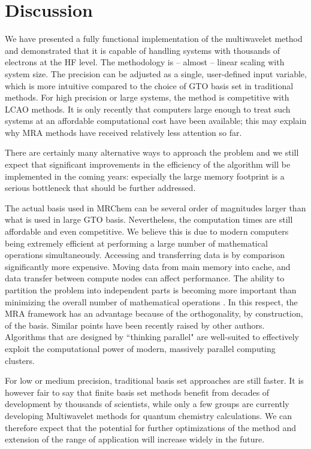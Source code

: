 \documentclass[journal=jctcce, manuscript=article]{achemso}
\begin{document}
\section{Discussion}

We have presented a fully functional implementation of the
multiwavelet method and demonstrated that it is capable of handling
systems with thousands of electrons at the \ac{HF}
level. The methodology is -- almost -- linear scaling with
system size. The precision can be adjusted as a single, user-defined input variable,
which is more intuitive compared to the choice of \ac{GTO} basis set
in traditional methods. For high precision or large systems, the
method is competitive with \ac{LCAO}
methods. It is only recently that computers large enough to treat such
systems at an affordable computational cost have been available; this
may explain why \ac{MRA} methods have received relatively less attention so
far.

There are certainly many alternative ways to approach the problem and
we still expect that significant improvements in the efficiency of the
algorithm will be implemented in the coming years: especially the
large memory footprint is a serious bottleneck that should be further
addressed.

The actual basis used in MRChem can be
several order of magnitudes larger than what is used in large \ac{GTO}
basis. Nevertheless, the computation times are still affordable and even
competitive. We believe this is due to modern computers being
extremely efficient at performing a large number of
mathematical operations simultaneously. Accessing and transferring data is by comparison
significantly more expensive. Moving data from main memory into
cache, and data transfer between compute nodes can affect
performance. The ability to
partition the problem into independent parts is becoming more
important than minimizing the overall number of mathematical
operations \cite{Gavini}. In this respect, the \ac{MRA} framework has an advantage
because of the orthogonality, by construction, of the basis. Similar points have been recently raised by other authors.
\cite{Penchoff2021-cl, Ratcliff2017-nr}
Algorithms that are designed by ``thinking parallel" are well-suited to effectively exploit the computational power of 
modern, massively parallel computing clusters.\cite{Mattson2004-oc,McCool2012-tx}

For low or medium precision, traditional basis set
approaches are still faster.  It is however fair to say that finite
basis set methods benefit from decades of development by thousands of
scientists, while only a few groups are currently developing
Multiwavelet methods for quantum chemistry calculations. We can
therefore expect that the potential for further optimizations of the
method and extension of the range of application will increase widely
in the future.
\end{document}

